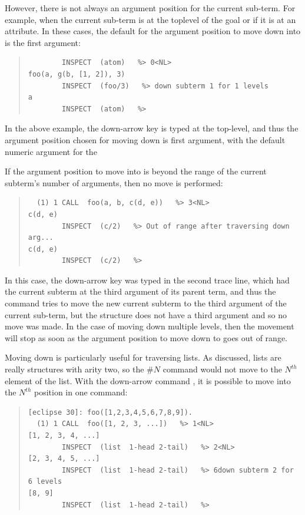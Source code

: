 \begin{descr}{1cm}
However, there is not always an argument position for the current
sub-term. For example, when the current sub-term is at the toplevel of the goal
or if it is at an attribute. In these cases, the default for the argument
position to move down into is the first argument: 
\begin{quote}\begin{verbatim}
        INSPECT  (atom)   %> 0<NL>
foo(a, g(b, [1, 2]), 3)
        INSPECT  (foo/3)   %> down subterm 1 for 1 levels
a
        INSPECT  (atom)   %> 
\end{verbatim}\end{quote}

In the above example, the down-arrow key is typed at the top-level, and
thus the argument position chosen for moving down is first argument, with
the default numeric argument for the 


If the argument position to move into is beyond the range of the current
subterm's number of arguments, then no move is performed:

\begin{quote}\begin{verbatim}
  (1) 1 CALL  foo(a, b, c(d, e))   %> 3<NL>
c(d, e)
        INSPECT  (c/2)   %> Out of range after traversing down arg...
c(d, e)
        INSPECT  (c/2)   %> 
\end{verbatim}\end{quote}
In this case, the down-arrow key was typed in the second trace line, which
had the current subterm at the third argument of its parent term, and thus
the command tries to move the new current subterm to the third argument of
the current sub-term, but the structure does not have a third argument and
so no move was made. In the case of moving down multiple levels, then the
movement will stop as soon as the argument position to move down to goes
out of range.

Moving down is particularly useful for traversing lists. As discussed,
lists are really structures with arity two, so the $\#N$ command would
not move to the $N^{th}$ element of the list. With the down-arrow command ,
it is possible to move into the $N^{th}$ position in one command:

\begin{quote}\begin{verbatim}
[eclipse 30]: foo([1,2,3,4,5,6,7,8,9]).
  (1) 1 CALL  foo([1, 2, 3, ...])   %> 1<NL>
[1, 2, 3, 4, ...]
        INSPECT  (list  1-head 2-tail)   %> 2<NL>
[2, 3, 4, 5, ...]
        INSPECT  (list  1-head 2-tail)   %> 6down subterm 2 for 6 levels
[8, 9]
        INSPECT  (list  1-head 2-tail)   %> 
\end{verbatim}\end{quote}


\end{descr}
